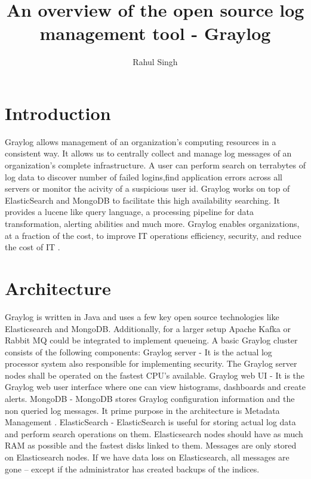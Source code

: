 \documentclass[9pt,twocolumn,twoside]{styles/osajnl}
\title{An overview of the open source log management tool - Graylog}
\author[1]{Rahul Singh}
\affil[1]{School of Informatics and Computing, Bloomington, IN 47408, U.S.A.}
\affil[*]{Corresponding authors: rahpsing@iu.edu}
\begin{document}
\maketitle

\section{Introduction}
Graylog allows management of an organization's computing resources in
a consistent way. It allows us to centrally collect and manage log
messages of an organization’s complete infrastructure. A user can
perform search on terrabytes of log data to discover number of failed
logins,find application errors across all servers or monitor the
acivity of a suspicious user id. Graylog works on top of ElasticSearch
and MongoDB to facilitate this high availability searching. It
provides a lucene like query language, a processing pipeline for data
transformation, alerting abilities and much more. Graylog enables
organizations, at a fraction of the cost, to improve IT operations
efficiency, security, and reduce the cost of IT \cite{www-graylog-crunchbase}.


\section{Architecture}

Graylog is written in Java and uses a few key open source technologies
like Elasticsearch and MongoDB. Additionally, for a larger setup
Apache Kafka or Rabbit MQ could be integrated to implement queueing.
A basic Graylog cluster consists of the following components:
\newline
\newline
Graylog server - It is the actual log processor system also
responsible for implementing security. The Graylog server nodes shall
be operated on the fastest CPU's available.
\newline
\newline
Graylog web UI - It is the Graylog web user interface where one can
view histograms, dashboards and create alerts.
\newline
\newline
MongoDB - MongoDB stores Graylog configuration information and the non
queried log messages. It prime purpose in the architecture is Metadata
Management \cite{www-graylogprocessing-severalnines}.
\newline
\newline
ElasticSearch - ElasticSearch is useful for storing actual log data
and perform search operations on them. Elasticsearch nodes should have
as much RAM as possible and the fastest disks linked to them. Messages
are only stored on Elasticsearch nodes. If we have data loss on
Elasticsearch, all messages are gone – except if the administrator has
created backups of the indices.
\end{document}
